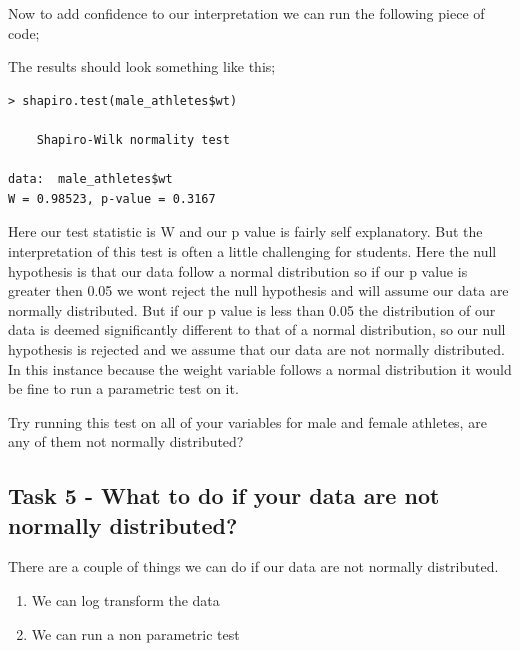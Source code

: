\documentclass[
]{book}
\newenvironment{Shaded}{\begin{snugshade}}{\end{snugshade}}
\newcommand{\CommentTok}[1]{\textcolor[rgb]{0.56,0.35,0.01}{\textit{#1}}}
\newcommand{\FunctionTok}[1]{\textcolor[rgb]{0.00,0.00,0.00}{#1}}
\newcommand{\NormalTok}[1]{#1}
\newcommand{\SpecialCharTok}[1]{\textcolor[rgb]{0.00,0.00,0.00}{#1}}
\providecommand{\tightlist}{%
  \setlength{\itemsep}{0pt}\setlength{\parskip}{0pt}}
\begin{document}
Now to add confidence to our interpretation we can run the following piece of code;

\begin{Shaded}
\end{Shaded}

The results should look something like this;

\begin{verbatim}
> shapiro.test(male_athletes$wt)

    Shapiro-Wilk normality test

data:  male_athletes$wt
W = 0.98523, p-value = 0.3167
\end{verbatim}

Here our test statistic is W and our p value is fairly self explanatory. But the interpretation of this test is often a little challenging for students. Here the null hypothesis is that our data follow a normal distribution so if our p value is greater then 0.05 we wont reject the null hypothesis and will assume our data are normally distributed. But if our p value is less than 0.05 the distribution of our data is deemed significantly different to that of a normal distribution, so our null hypothesis is rejected and we assume that our data are not normally distributed. In this instance because the weight variable follows a normal distribution it would be fine to run a parametric test on it.

Try running this test on all of your variables for male and female athletes, are any of them not normally distributed?

\hypertarget{task-5---what-to-do-if-your-data-are-not-normally-distributed}{%
\subsection{Task 5 - What to do if your data are not normally distributed?}\label{task-5---what-to-do-if-your-data-are-not-normally-distributed}}

There are a couple of things we can do if our data are not normally distributed.

\begin{enumerate}
\def\labelenumi{\arabic{enumi})}
\tightlist
\item
  We can log transform the data
\item
  We can run a non parametric test
\end{enumerate}
\end{document}
